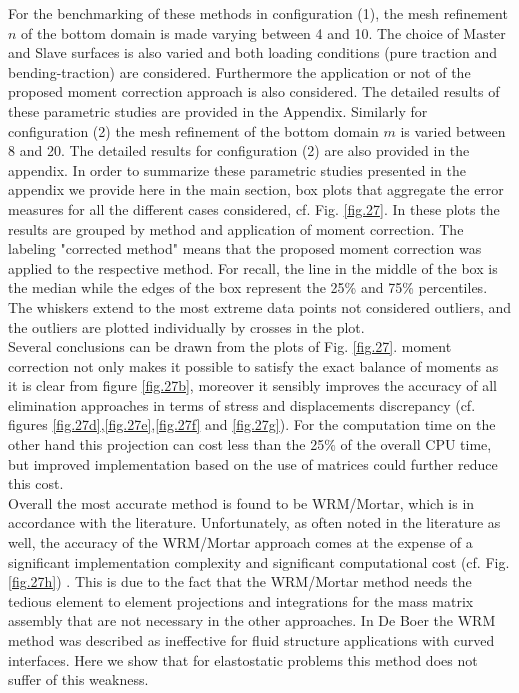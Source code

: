  For the benchmarking of these methods in configuration (1), the mesh refinement $n$ of the bottom domain is made varying between 4 and 10.  The choice of Master and Slave surfaces is also varied and both loading conditions (pure traction and bending-traction) are considered. Furthermore the application or not of the proposed moment correction approach is also considered. The detailed results of these parametric studies are provided in the Appendix.  Similarly for configuration (2) the mesh refinement of the bottom domain $m$ is varied between 8 and 20. The detailed results for configuration (2) are also provided in the appendix. In order to summarize these parametric studies presented in the appendix we provide here in the main section, box plots that aggregate the error measures for all the different cases considered, cf. Fig. \ref{fig.27}. In these plots the results are grouped by method and application of moment correction. The labeling "corrected method" means that the proposed moment correction was applied to the respective method. For recall, the line in the middle of the box is the median while the edges of the box represent the 25\% and 75\% percentiles. The whiskers extend to the most extreme data points not considered outliers, and the outliers are plotted individually by crosses in the plot.
 \\
 Several conclusions can be drawn from the plots of Fig. \ref{fig.27}.
  moment correction not only makes it possible to satisfy the exact balance of moments as it is clear from figure \ref{fig.27b}, moreover it sensibly improves the accuracy of all elimination approaches in terms of stress and displacements discrepancy (cf. figures \ref{fig.27d},\ref{fig.27e},\ref{fig.27f} and \ref{fig.27g}). For the computation time on the other hand this projection can cost less than the 25$\%$ of the overall CPU time, but improved implementation based on the use of matrices could further reduce this cost.   
 \\
 Overall the most accurate method is found to be WRM/Mortar, which is in accordance with the literature. Unfortunately, as often noted in the literature as well, the accuracy of the WRM/Mortar approach comes at the expense of a significant implementation complexity and significant computational cost (cf. Fig. \ref{fig.27h}) . This is due to the fact that the WRM/Mortar method needs the tedious element to element projections and integrations for the mass matrix assembly that are not necessary in the other approaches. In De Boer the WRM method was described as ineffective for fluid structure applications with curved interfaces. Here we show that for elastostatic problems this method does not suffer of this weakness. 
